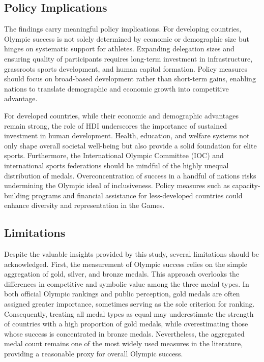 \documentclass[11pt,twoside]{article}
\numberwithin{Theorem}{section}
\numberwithin{Definition}{section}
\numberwithin{Lemma}{section}
\numberwithin{Algorithm}{section}
\numberwithin{equation}{section}
\begin{document}
\subsection{Policy Implications}
The findings carry meaningful policy implications. For developing countries, Olympic success is not solely determined by economic or demographic size but hinges on systematic support for athletes. Expanding delegation sizes and ensuring quality of participants requires long-term investment in infrastructure, grassroots sports development, and human capital formation. Policy measures should focus on broad-based development rather than short-term gains, enabling nations to translate demographic and economic growth into competitive advantage.  

For developed countries, while their economic and demographic advantages remain strong, the role of HDI underscores the importance of sustained investment in human development. Health, education, and welfare systems not only shape overall societal well-being but also provide a solid foundation for elite sports. Furthermore, the International Olympic Committee (IOC) and international sports federations should be mindful of the highly unequal distribution of medals. Overconcentration of success in a handful of nations risks undermining the Olympic ideal of inclusiveness. Policy measures such as capacity-building programs and financial assistance for less-developed countries could enhance diversity and representation in the Games.  

\subsection{Limitations}
Despite the valuable insights provided by this study, several limitations should be acknowledged. First, the measurement of Olympic success relies on the simple aggregation of gold, silver, and bronze medals. This approach overlooks the differences in competitive and symbolic value among the three medal types. In both official Olympic rankings and public perception, gold medals are often assigned greater importance, sometimes serving as the sole criterion for ranking. Consequently, treating all medal types as equal may underestimate the strength of countries with a high proportion of gold medals, while overestimating those whose success is concentrated in bronze medals. Nevertheless, the aggregated medal count remains one of the most widely used measures in the literature, providing a reasonable proxy for overall Olympic success.  
\end{document}
